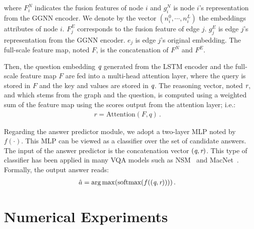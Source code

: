 \documentclass[letterpaper]{article} %
\begin{document}
where $F_i^N$ indicates the fusion features of node $i$ and $g_i^N$ is node $i$'s representation from the GGNN encoder. 
We denote by the vector $(n_i^0, \cdots,n_i^L)$ the embeddings attributes of node $i$. 
$F_j^E$ corresponds to the fusion feature of edge $j$. $g_j^E$ is edge $j$'s representation from the GGNN encoder. 
$e_j$ is edge $j$'s original embedding. 
The full-scale feature map, noted $F$, is the concatenation of $F^N$ and $F^E$.

Then, the question embedding $\emph{q}$ generated from the LSTM encoder and the full-scale feature map $F$ are fed into a multi-head attention layer, where the query is stored in $F$ and the key and values are stored in $\emph{q}$.
The reasoning vector, noted $\emph{r}$, and which stems from the graph and the question, is computed using a weighted sum of the feature map using the scores output from the attention layer; i.e.:
\begin{gather}
    r = \text{Attention}(F, q) \, .
\end{gather}

Regarding the answer predictor module, we adopt a two-layer MLP noted by $f(\cdot)$. 
This MLP can be viewed as a classifier over the set of candidate answers. 
The input of the answer predictor is the concatenation vector $(\emph{q},\emph{r})$. 
This type of classifier has been applied in many VQA models such as NSM~\cite{DBLP:conf/nips/HudsonM19} and MacNet~\cite{DBLP:conf/nips/LuYBP16}.
Formally, the output answer reads:
\begin{gather}
    \hat{a} = \mathop{\arg\max}(\text{softmax}(f((\emph{q},\emph{r}))))\, .
\end{gather}



\section{Numerical Experiments}\label{sec:experiments}
\end{document}
